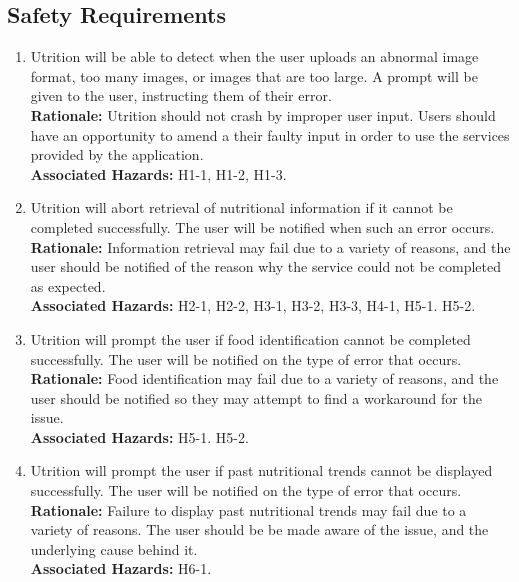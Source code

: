\documentclass{article}
\begin{document}
\subsection{Safety Requirements}
\begin{enumerate}[{SR}1.]
	\item Utrition will be able to detect when the user uploads an abnormal 
	image format, too many images, or images that are too large. A prompt will 
	be given to the user, instructing them of their error. \\
	\textbf{Rationale:}  Utrition should not crash by improper user 
	input. Users should have an opportunity to amend a their faulty input in 
	order to use the services provided by the application.\\	
	\textbf{Associated Hazards:} H1-1, H1-2, H1-3.
	
	\item Utrition will abort retrieval of nutritional information if it cannot 
	be completed successfully. The user will be notified when such 
	an error occurs. \\
	\textbf{Rationale:}  Information retrieval may fail due to a variety of 
	reasons, and the user should be notified of the reason why the service 
	could not be completed as expected.\\	
	\textbf{Associated Hazards:} H2-1, H2-2, H3-1, H3-2, H3-3, H4-1, H5-1. H5-2.
	
	\item Utrition will prompt the user if food identification cannot 
	be completed successfully. The user will be notified on the type of error 
	that occurs. \\
	\textbf{Rationale:}  Food identification may fail due to a variety of 
	reasons, and the user should be notified so they may attempt to find a  
	workaround for the issue. \\	
	\textbf{Associated Hazards:} H5-1. H5-2.
	
	\item Utrition will prompt the user if past nutritional trends cannot
	be displayed successfully. The user will be notified on the type of error 
	that occurs. \\
	\textbf{Rationale:}  Failure to display past nutritional trends may fail 
	due to a variety of reasons. The user should be be made aware of the issue, 
	and the underlying cause behind it.\\	
	\textbf{Associated Hazards:} H6-1.
\end{enumerate}
\end{document}

